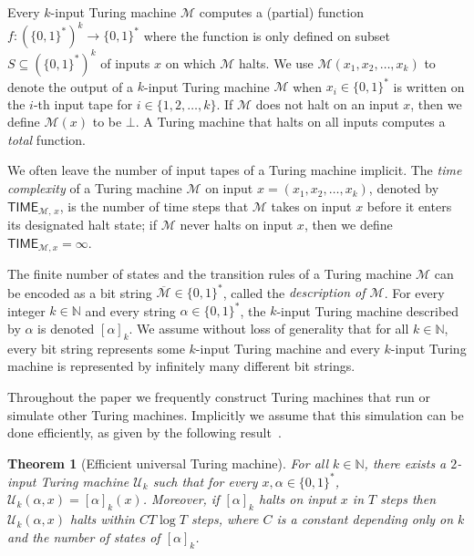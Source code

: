 \documentclass[11pt]{article}
\newtheorem{theorem}{Theorem}[section]
\theoremstyle{definition}
\newcommand{\N}{\ensuremath{\mathbb{N}}}
\newcommand{\desc}{\overline}
\newcommand{\machine}{\cal{M}}
\renewcommand{\cal}[1]{\mathcal{#1}}
\newcommand{\TIME}{\mathsf{TIME}}
\begin{document}
Every $k$-input Turing machine $\cal{M}$ computes a (partial) function $f: (\{0,
1\}^*)^k \to \{0,1\}^*$ where the function is only defined on subset $S
\subseteq (\{0,1\}^*)^k$ of inputs $x$ on which $\machine$ halts.
We use $\cal{M}(x_1, x_2, \ldots, x_k)$ to denote the output of a $k$-input
Turing machine $\cal{M}$ when $x_i \in \{0,1\}^*$ is written on the $i$-th input
tape for $i \in \{1, 2, \ldots, k\}$.
If $\cal{M}$ does not halt on an input $x$, then we define $\cal{M}(x)$ to be
$\bot$.
A Turing machine that halts on all inputs computes a \emph{total} function. 

We often leave the number of input tapes of a Turing machine implicit.
The \emph{time complexity} of a Turing machine $\cal{M}$ on input $x = (x_1,
x_2, \ldots, x_k)$, denoted by $\TIME_{\cal{M},\, x}$, is the number of time
steps that $\cal{M}$ takes on input $x$ before it enters its designated halt
state; if $\cal{M}$ never halts on input $x$, then we define $\TIME_{\cal{M},x}
= \infty$.


The finite number of states and the transition rules of a Turing machine
$\cal{M}$ can be encoded as a bit string $\desc{\cal{M}} \in \{0, 1\}^*$, called
the \emph{description of $\cal{M}$}.
For every integer $k \in \N$ and every string $\alpha \in \{0, 1\}^*$, the
$k$-input Turing machine described by $\alpha$ is denoted $[\alpha]_k$.
We assume without loss of generality that for all $k \in \N$, every bit string
represents some $k$-input Turing machine and every $k$-input Turing machine is
represented by infinitely many different bit strings.

Throughout the paper we frequently construct Turing machines that run or
simulate other Turing machines.
Implicitly we assume that this simulation can be done efficiently, as given by
the following result~\cite{hennie1966two}.

\begin{theorem}[Efficient universal Turing machine]
  \label{thm:universal-tm}
  For all $k \in \N$, there exists a $2$-input Turing machine $\cal{U}_k$ such
  that for every $x, \alpha \in \{0,1\}^*$, $\cal{U}_k (\alpha, x) =
  [\alpha]_k(x)$.
  Moreover, if $[\alpha]_k$ halts on input $x$ in $T$ steps then $\cal{U}_k
  (\alpha, x)$ halts within $C T \log T$ steps, where $C$ is a constant
  depending only on $k$ and the number of states of $[\alpha]_k$.
\end{theorem}
\end{document}
